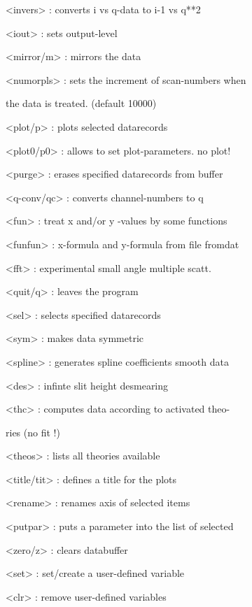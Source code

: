 \documentclass[]{article}
\begin{document}
\textless{}invers\textgreater{} : converts i vs q-data to i-1 vs q**2

\textless{}iout\textgreater{} : sets output-level

\textless{}mirror/m\textgreater{} : mirrors the data

\textless{}numorpls\textgreater{} : sets the increment of scan-numbers
when

the data is treated. (default 10000)

\textless{}plot/p\textgreater{} : plots selected datarecords

\textless{}plot0/p0\textgreater{} : allows to set plot-parameters. no
plot!

\textless{}purge\textgreater{} : erases specified datarecords from
buffer

\textless{}q-conv/qc\textgreater{} : converts channel-numbers to q

\textless{}fun\textgreater{} : treat x and/or y -values by some
functions

\textless{}funfun\textgreater{} : x-formula and y-formula from file
fromdat

\textless{}fft\textgreater{} : experimental small angle multiple scatt.

\textless{}quit/q\textgreater{} : leaves the program

\textless{}sel\textgreater{} : selects specified datarecords

\textless{}sym\textgreater{} : makes data symmetric

\textless{}spline\textgreater{} : generates spline coefficients smooth
data

\textless{}des\textgreater{} : infinte slit height desmearing

\textless{}thc\textgreater{} : computes data according to activated
theo-

ries (no fit !)

\textless{}theos\textgreater{} : lists all theories available

\textless{}title/tit\textgreater{} : defines a title for the plots

\textless{}rename\textgreater{} : renames axis of selected items

\textless{}putpar\textgreater{} : puts a parameter into the list of
selected

\textless{}zero/z\textgreater{} : clears databuffer

\textless{}set\textgreater{} : set/create a user-defined variable

\textless{}clr\textgreater{} : remove user-defined variables
\end{document}
